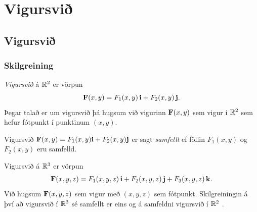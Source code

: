 
\theoremstyle{definition}
\newtheorem{exercise}[theorem]{}





\newbox\mytempbox
\newdimen\mytempdimen

\newcommand\includegraphicscopyright[3][]{%
  \leavevmode\vbox{\vskip3pt\raggedright\setbox\mytempbox=\hbox{\texttt{[image: \#2]}}%
    \mytempdimen=\wd\mytempbox\box\mytempbox\par\vskip1pt%
    \fontsize{3}{3.5}\selectfont{\color{black!25}{\vbox{\hsize=\mytempdimen#3}}}\vskip3pt%
}}

\newenvironment{colortabular}[1]{\medskip\rowcolors[]{1}{blue!20}{blue!10}\tabular{#1}\rowcolor{blue!40}}{\endtabular\medskip}

\def\equad{\leavevmode\hbox{}\quad}

\newenvironment{greencolortabular}[1]
{\medskip\rowcolors[]{1}{green!50!black!20}{green!50!black!10}%
  \tabular{#1}\rowcolor{green!50!black!40}}%
{\endtabular\medskip}




\section{Vigursvið}

\subsection{Vigursvið} 

\subsubsection{Skilgreining }
 {\em Vigursvið} á ${\mathbb R}^2$ er vörpun
$$\mbox{${\bf F}$}(x,y)=F_1(x,y)\,\mbox{${\bf i}$}+F_2(x,y)\,\mbox{${\bf j}$}.$$
Þegar talað er um vigursvið þá hugsum við vigurinn $\mbox{${\bf F}$}(x,y)$ sem vigur í
${\mathbb R}^2$ sem hefur fótpunkt í punktinum $(x,y)$.   

 \medskip
Vigursvið $\mbox{${\bf F}$}(x,y)=F_1(x,y)\mbox{${\bf i}$}+F_2(x,y)\mbox{${\bf j}$}$ er sagt {\em samfellt} ef
föllin $F_1(x,y)$ og $F_2(x,y)$ eru samfelld.

\medskip
Vigursvið á ${\mathbb R}^3$ er vörpun 
$$\mbox{${\bf F}$}(x,y,z)=F_1(x,y,z)\,\mbox{${\bf i}$}+F_2(x,y,z)\,\mbox{${\bf j}$}+F_3(x,y,z)\,\mbox{${\bf k}$}.$$
Við hugsum $\mbox{${\bf F}$}(x,y,z)$ sem vigur með $(x,y,z)$ sem fótpunkt.
  Skilgreiningin á því að
vigursvið í ${\mathbb R}^3$ sé samfellt er eins og á samfeldni vigursvið í
${\mathbb R}^2$ . 



